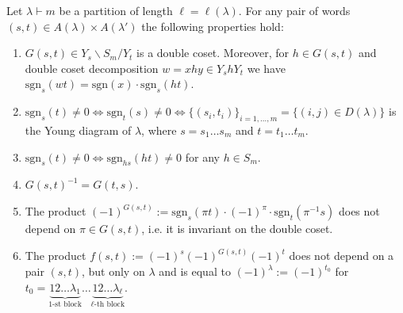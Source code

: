 \documentclass[10pt,a4paper]{amsart}
\newcommand{\sgn}{\mathrm{sgn}}
\begin{document}
\begin{lemma}\label{lemma:gst}
    Let $\lambda\vdash m$ be a partition of length $\ell = \ell(\lambda)$. For any pair of words $(s,t) \in A(\lambda) \times A(\lambda')$ the following properties hold:
    \begin{enumerate}[label=(\alph*)]
        \item  $G(s,t) \in Y_{s} \backslash S_m / Y_{t}$ is a double coset. Moreover, for $h \in G(s,t)$ and double coset decomposition $w = xhy \in Y_s h Y_t$ we have $\sgn_s(wt) = \sgn(x)\cdot \sgn_s(ht)$.
        \item $\sgn_s(t) \neq 0 \iff \sgn_t(s) \neq 0 \iff \{(s_i, t_i)\}_{i=1,\ldots,m} = \{(i,j) \in D(\lambda) \}$ is the Young diagram of $\lambda$, where $s = s_1\ldots s_m$ and $t = t_1 \ldots t_m$. 
        \item $\sgn_{s}(t) \neq 0 \iff \sgn_{hs}(ht) \neq 0$ for any $h\in S_m$.
        \item $G(s,t)^{-1} = G(t,s)$.
        \item The product $(-1)^{G(s,t)} := \sgn_s(\pi t) \cdot (-1)^{\pi} \cdot \sgn_{t}(\pi^{-1}s)$ does not depend on $\pi \in G(s,t)$, i.e. it is invariant on the double coset.
        \item The product $f(s,t) := (-1)^s(-1)^{G(s,t)}(-1)^t$
        does not depend on a pair $(s,t)$, but only on $\lambda$ and is equal to $(-1)^{\lambda} := (-1)^{t_0}$ for $t_0 = \underbrace{12\ldots \lambda_1}_{1\text{-st block}}\ldots \underbrace{12\ldots\lambda_{\ell}}_{\ell\text{-th block}}$.
    \end{enumerate}
\end{lemma}
\end{document}
